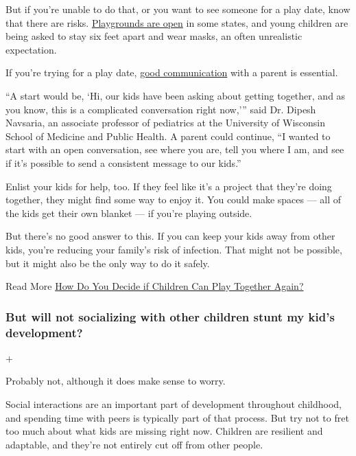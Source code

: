 But if you're unable to do that, or you want to see someone for a play
date, know that there are risks.
\href{https://www.nytimes3xbfgragh.onion/2020/06/11/parenting/playgrounds-reopen-safety-coronavirus.html}{Playgrounds
are open} in some states, and young children are being asked to stay six
feet apart and wear masks, an often unrealistic expectation.

If you're trying for a play date,
\href{https://www.nytimes3xbfgragh.onion/2020/06/29/parenting/family-socially-distancing-coronavirus.html}{good
communication} with a parent is essential.

``A start would be, `Hi, our kids have been asking about getting
together, and as you know, this is a complicated conversation right
now,''' said Dr. Dipesh Navsaria, an associate professor of pediatrics
at the University of Wisconsin School of Medicine and Public Health. A
parent could continue, ``I wanted to start with an open conversation,
see where you are, tell you where I am, and see if it's possible to send
a consistent message to our kids.''

Enlist your kids for help, too. If they feel like it's a project that
they're doing together, they might find some way to enjoy it. You could
make spaces --- all of the kids get their own blanket --- if you're
playing outside.

But there's no good answer to this. If you can keep your kids away from
other kids, you're reducing your family's risk of infection. That might
not be possible, but it might also be the only way to do it safely.

Read More
\href{https://www.nytimes3xbfgragh.onion/2020/06/01/well/family/coronavirus-reopening-children-parents-play-dates.html}{How
Do You Decide if Children Can Play Together Again?}

\hypertarget{but-will-not-socializing-with-other-children-stunt-my-kids-development}{%
\subsubsection{But will not socializing with other children stunt my
kid's
development?}\label{but-will-not-socializing-with-other-children-stunt-my-kids-development}}

+

Probably not, although it does make sense to worry.

Social interactions are an important part of development throughout
childhood, and spending time with peers is typically part of that
process. But try not to fret too much about what kids are missing right
now. Children are resilient and adaptable, and they're not entirely cut
off from other people.

